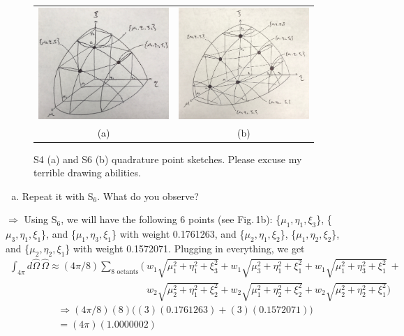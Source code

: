 \documentclass[10pt]{article}
\begin{document}
\begin{figure}[H]
    \centering
    \begin{tabular}{cc}
        \includegraphics[height=120pt]{Figures/S4.jpg} &
        \includegraphics[height=120pt]{Figures/S6.jpg} \\
        \scriptsize{(a)} & \scriptsize{(b)} \\ [-1.2ex]
    \end{tabular}
    \caption{S4 (a) and S6 (b) quadrature point sketches. Please excuse my terrible drawing abilities.}
    \label{fig1}
\end{figure}


\vspace{10pt}
\begin{enumerate}[(b)]
\item Repeat it with S$_6$. What do you observe?\\[-5pt]
\end{enumerate}

$\Rightarrow$ Using S$_6$, we will have the following 6 points (see Fig.\,1b): \{$\mu_1, \eta_1, \xi_3$\}, \{$\mu_3, \eta_1, \xi_1$\}, and \{$\mu_1, \eta_3, \xi_1$\} with weight 0.1761263, and \{$\mu_2, \eta_1, \xi_2$\}, \{$\mu_1, \eta_2, \xi_2$\}, and \{$\mu_2, \eta_2, \xi_1$\} with weight 0.1572071. Plugging in everything, we get
%
\begin{align*}
        \int_{4\pi} d\hat{\Omega}\,\hat{\Omega} \approx (4\pi/8) \sum_{\textrm{8 octants}} \Big( &w_1\sqrt{\mu_1^2 + \eta_1^2 + \xi_3^2} + w_1\sqrt{\mu_3^2 + \eta_1^2 + \xi_1^2} + w_1\sqrt{\mu_1^2 + \eta_3^2 + \xi_1^2} \ + \\
        &w_2\sqrt{\mu_2^2 + \eta_1^2 + \xi_2^2} + w_2\sqrt{\mu_1^2 + \eta_2^2 + \xi_2^2} + w_2\sqrt{\mu_2^2 + \eta_2^2 + \xi_1^2} \Big)
\end{align*}
%
\begin{align*}
        &\Rightarrow (4\pi/8)(8)\Big((3)(0.1761263) + (3)(0.1572071)\Big) \\
        &= (4\pi)(1.0000002)
\end{align*}
\end{document}
